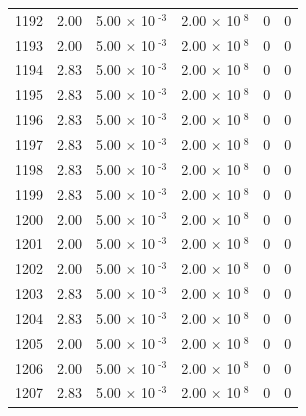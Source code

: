 \documentclass[a4paper,11pt]{article}
\begin{document}
\begin{center}
\begin{longtable}{|R{1.5cm}|R{2.4cm}|R{2.4cm}|R{2.4cm}|R{2.4cm}|R{2.4cm}|}
 1192 &   2.00  &         5.00 $\times$ 10$^{\text{          -3}}$  &         2.00 $\times$ 10$^{\text{           8}}$  & 0  & 0 \\
 1193 &   2.00  &         5.00 $\times$ 10$^{\text{          -3}}$  &         2.00 $\times$ 10$^{\text{           8}}$  & 0  & 0 \\
 1194 &   2.83  &         5.00 $\times$ 10$^{\text{          -3}}$  &         2.00 $\times$ 10$^{\text{           8}}$  & 0  & 0 \\
 1195 &   2.83  &         5.00 $\times$ 10$^{\text{          -3}}$  &         2.00 $\times$ 10$^{\text{           8}}$  & 0  & 0 \\
 1196 &   2.83  &         5.00 $\times$ 10$^{\text{          -3}}$  &         2.00 $\times$ 10$^{\text{           8}}$  & 0  & 0 \\
 1197 &   2.83  &         5.00 $\times$ 10$^{\text{          -3}}$  &         2.00 $\times$ 10$^{\text{           8}}$  & 0  & 0 \\
 1198 &   2.83  &         5.00 $\times$ 10$^{\text{          -3}}$  &         2.00 $\times$ 10$^{\text{           8}}$  & 0  & 0 \\
 1199 &   2.83  &         5.00 $\times$ 10$^{\text{          -3}}$  &         2.00 $\times$ 10$^{\text{           8}}$  & 0  & 0 \\
 1200 &   2.00  &         5.00 $\times$ 10$^{\text{          -3}}$  &         2.00 $\times$ 10$^{\text{           8}}$  & 0  & 0 \\
 1201 &   2.00  &         5.00 $\times$ 10$^{\text{          -3}}$  &         2.00 $\times$ 10$^{\text{           8}}$  & 0  & 0 \\
 1202 &   2.00  &         5.00 $\times$ 10$^{\text{          -3}}$  &         2.00 $\times$ 10$^{\text{           8}}$  & 0  & 0 \\
 1203 &   2.83  &         5.00 $\times$ 10$^{\text{          -3}}$  &         2.00 $\times$ 10$^{\text{           8}}$  & 0  & 0 \\
 1204 &   2.83  &         5.00 $\times$ 10$^{\text{          -3}}$  &         2.00 $\times$ 10$^{\text{           8}}$  & 0  & 0 \\
 1205 &   2.00  &         5.00 $\times$ 10$^{\text{          -3}}$  &         2.00 $\times$ 10$^{\text{           8}}$  & 0  & 0 \\
 1206 &   2.00  &         5.00 $\times$ 10$^{\text{          -3}}$  &         2.00 $\times$ 10$^{\text{           8}}$  & 0  & 0 \\
 1207 &   2.83  &         5.00 $\times$ 10$^{\text{          -3}}$  &         2.00 $\times$ 10$^{\text{           8}}$  & 0  & 0 \\

\end{longtable}
\end{center}
\end{document}
